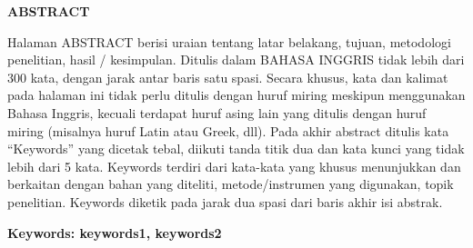 \clearpage
{}%
\thispagestyle{fancy}

\begin{center}
	\large \bfseries \MakeUppercase{Abstract}\\
	\bigskip
	
	\normalsize \normalfont \justifying \singlespacing
	Halaman ABSTRACT berisi uraian tentang latar belakang, tujuan, metodologi penelitian, hasil / kesimpulan. Ditulis dalam BAHASA INGGRIS tidak lebih dari 300 kata, dengan jarak antar baris satu spasi. Secara khusus, kata dan kalimat pada halaman ini tidak perlu ditulis dengan huruf miring meskipun menggunakan Bahasa Inggris, kecuali terdapat huruf asing lain yang ditulis dengan huruf miring (misalnya huruf Latin atau Greek, dll). Pada akhir abstract ditulis kata “Keywords” yang dicetak tebal, diikuti tanda titik dua dan kata kunci yang tidak lebih dari 5 kata. Keywords terdiri dari kata-kata yang khusus menunjukkan dan berkaitan dengan bahan yang diteliti, metode/instrumen yang digunakan, topik penelitian. Keywords diketik pada jarak dua spasi dari baris akhir isi abstrak.\par
    
    \vspace{20pt}
	\raggedright\textbf{Keywords: keywords1, keywords2}
	
	\vfill
	
\end{center}
\clearpage